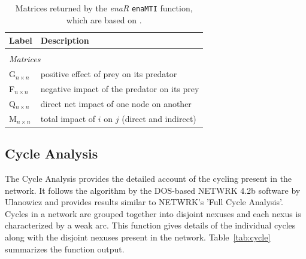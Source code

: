 \documentclass[article]{jss}
\begin{document}
\begin{table}[t]
  \caption{Matrices returned by the \textit{enaR}    %
    \texttt{enaMTI} function, which are based on \citep{ulanowicz90}.}\label{tab:mti}
  \center
  \begin{small}
    \begin{tabular}{l l}
      \textbf{Label} & \textbf{Description} \\ \hline \\[-1.5ex]
      \multicolumn{2}{l}{\textit{Matrices}} \\[1ex]
      G$_{n \times n}$ & positive effect of prey on its predator \\  %
      F$_{n \times n}$ & negative impact of the predator on its prey \\
      Q$_{n \times n}$ & direct net impact of one node on another\\
      M$_{n \times n}$ & total impact of $i$ on $j$ (direct and indirect) \\ \hline
\end{tabular}
\end{small}
\end{table}



\subsection{Cycle Analysis}
The Cycle Analysis provides the detailed account of the cycling
present in the network. It follows the algorithm by the DOS-based
NETWRK 4.2b software by Ulanowicz \citep{ulanowicz91, ulanowicz83} and
provides results similar to NETWRK's 'Full Cycle Analysis'.  Cycles in
a network are grouped together into disjoint nexuses and each nexus is
characterized by a weak arc. This function gives details of the
individual cycles along with the disjoint nexuses present in the
network.  Table~\ref{tab:cycle} summarizes the function output.

\end{document}
